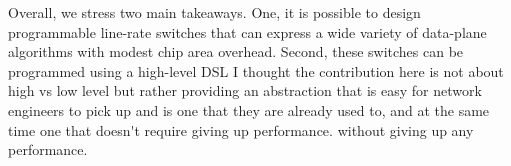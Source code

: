 Overall, we stress two main takeaways. One, it is possible to design
programmable line-rate switches that can express a wide variety of data-plane
algorithms with modest chip area overhead. Second, these switches can be
programmed using a high-level DSL \ac{I thought the contribution here is not about high vs
low level but rather providing an abstraction that is easy for network engineers to 
pick up and is one that they are already used to, and at the same time one that doesn't
require giving up performance.}
without giving up any performance.
\fi
